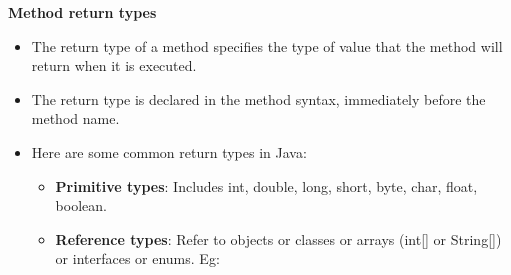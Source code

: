 \begin{flushleft}
	\newpage
	
	\textbf{Method return types}
	\begin{itemize}
		\item The return type of a method specifies the type of value that the method will return when it is executed. 
		\item The return type is declared in the method syntax, immediately before the method name. 
		\item Here are some common return types in Java:
		\begin{itemize}
			\item \textbf{Primitive types}: Includes int, double, long, short, byte, char, float, 
			boolean.
			
			\bigskip
			\bigskip
			\item \textbf{Reference types}: Refer to objects or classes or arrays (int[] or String[]) or interfaces or enums. Eg:
			\bigskip
\end{itemize}
\end{itemize}
\end{flushleft}
